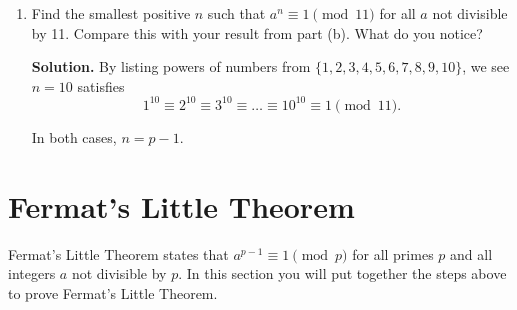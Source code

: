 \documentclass[11pt]{article}
\theoremstyle{definition}
\begin{document}
\begin{enumerate}
\begin{enumerate}
\begin{enumerate}
\item Find the smallest positive $n$ such that $a^n \equiv 1 \pmod{11}$ for all $a$ not divisible by 11. Compare this with your result from part (b). What do you notice?

\textbf{Solution.}
By listing powers of numbers from $\{1,2,3,4,5,6,7,8,9,10\}$, we see $n = 10$ satisfies
\[1^{10} \equiv 2^{10} \equiv 3^{10} \equiv \ldots \equiv 10^{10} \equiv 1 \pmod{11}.\]

In both cases, $n = p - 1$.

\end{enumerate}
\end{enumerate}

\end{enumerate}

\section{Fermat's Little Theorem}

Fermat's Little Theorem states that $a^{p-1} \equiv 1 \pmod{p}$ for
all primes $p$ and all integers $a$ not divisible by $p$. In
this section you will put together the steps above to prove
Fermat's Little Theorem.
\end{document}

